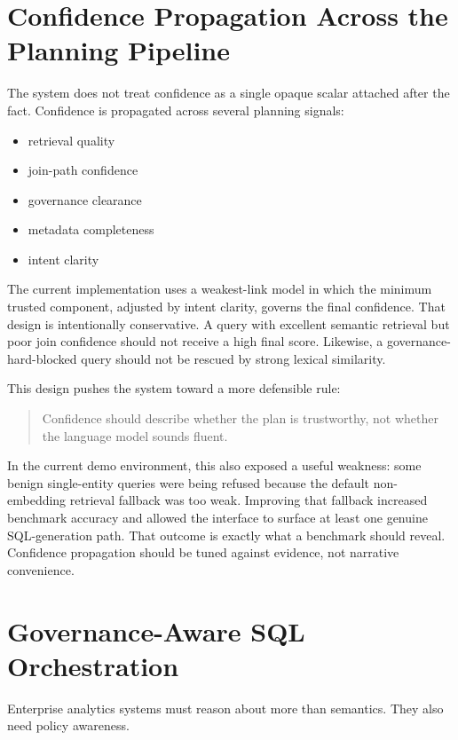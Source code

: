 \documentclass[11pt]{article}
\begin{document}
\section{Confidence Propagation Across the Planning Pipeline}

The system does not treat confidence as a single opaque scalar attached after the fact. Confidence is propagated across several planning signals:

\begin{itemize}[leftmargin=1.4em]
  \item retrieval quality
  \item join-path confidence
  \item governance clearance
  \item metadata completeness
  \item intent clarity
\end{itemize}

The current implementation uses a weakest-link model in which the minimum trusted component, adjusted by intent clarity, governs the final confidence. That design is intentionally conservative. A query with excellent semantic retrieval but poor join confidence should not receive a high final score. Likewise, a governance-hard-blocked query should not be rescued by strong lexical similarity.

This design pushes the system toward a more defensible rule:

\begin{quote}
Confidence should describe whether the plan is trustworthy, not whether the language model sounds fluent.
\end{quote}

In the current demo environment, this also exposed a useful weakness: some benign single-entity queries were being refused because the default non-embedding retrieval fallback was too weak. Improving that fallback increased benchmark accuracy and allowed the interface to surface at least one genuine SQL-generation path. That outcome is exactly what a benchmark should reveal. Confidence propagation should be tuned against evidence, not narrative convenience.

\section{Governance-Aware SQL Orchestration}

Enterprise analytics systems must reason about more than semantics. They also need policy awareness.
\end{document}
